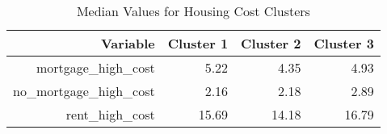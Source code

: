 \begin{table}[ht]
    \centering
    \caption{Median Values for Housing Cost Clusters}
    \label{tab:cost}
    \begin{tabular}{|r|r|r|r|}
    \hline
    Variable & Cluster 1 & Cluster 2 & Cluster 3 \\ 
    \hline
    mortgage\_high\_cost & 5.22 & 4.35 & 4.93 \\ 
    \hline
      no\_mortgage\_high\_cost & 2.16 & 2.18 & 2.89 \\ 
    \hline
      rent\_high\_cost & 15.69 & 14.18 & 16.79 \\ 
    \hline
    \end{tabular}
    \end{table}